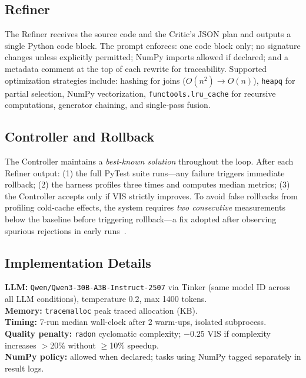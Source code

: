 \documentclass{article}
\begin{document}
\subsection{Refiner}

The Refiner receives the source code and the Critic's JSON plan and outputs a single Python code block. The prompt enforces: one code block only; no signature changes unless explicitly permitted; NumPy imports allowed if declared; and a metadata comment at the top of each rewrite for traceability. Supported optimization strategies include: hashing for joins ($O(n^2)\to O(n)$), \texttt{heapq} for partial selection, NumPy vectorization, \texttt{functools.lru\_cache} for recursive computations, generator chaining, and single-pass fusion.

\subsection{Controller and Rollback}

The Controller maintains a \emph{best-known solution} throughout the loop. After each Refiner output: (1) the full PyTest suite runs---any failure triggers immediate rollback; (2) the harness profiles three times and computes median metrics; (3) the Controller accepts only if VIS strictly improves. To avoid false rollbacks from profiling cold-cache effects, the system requires \emph{two consecutive} measurements below the baseline before triggering rollback---a fix adopted after observing spurious rejections in early runs~\cite{update2}.

\subsection{Implementation Details}

\noindent\textbf{LLM:} \texttt{Qwen/Qwen3-30B-A3B-Instruct-2507} via Tinker (same model ID across all LLM conditions), temperature 0.2, max 1400 tokens. \\
\textbf{Memory:} \texttt{tracemalloc} peak traced allocation (KB). \\
\textbf{Timing:} 7-run median wall-clock after 2 warm-ups, isolated subprocess. \\
\textbf{Quality penalty:} \texttt{radon} cyclomatic complexity; $-0.25$ VIS if complexity increases $>$20\% without $\geq$10\% speedup. \\
\textbf{NumPy policy:} allowed when declared; tasks using NumPy tagged separately in result logs.
\end{document}
